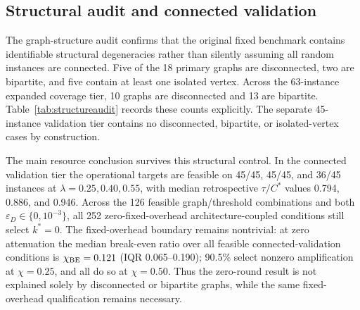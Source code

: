 \documentclass[5p,times]{elsarticle}
\begin{document}
\subsection{Structural audit and connected validation}
The graph-structure audit confirms that the original fixed benchmark contains identifiable structural degeneracies rather than silently assuming all random instances are connected. Five of the 18 primary graphs are disconnected, two are bipartite, and five contain at least one isolated vertex. Across the 63-instance expanded coverage tier, 10 graphs are disconnected and 13 are bipartite. Table~\ref{tab:structureaudit} records these counts explicitly. The separate 45-instance validation tier contains no disconnected, bipartite, or isolated-vertex cases by construction.

\begin{table}[t]
\centering
\caption{Structural audit of the exact graph tiers. The connected validation tier is conditioned on connected, non-bipartite topology; it does not replace the original primary benchmark.}
\label{tab:structureaudit}

\end{table}

The main resource conclusion survives this structural control. In the connected validation tier the operational targets are feasible on 45/45, 45/45, and 36/45 instances at $\lambda=0.25,0.40,0.55$, with median retrospective $\tau/C^*$ values 0.794, 0.886, and 0.946. Across the 126 feasible graph/threshold combinations and both $\varepsilon_D\in\{0,10^{-3}\}$, all 252 zero-fixed-overhead architecture-coupled conditions still select $k^*=0$. The fixed-overhead boundary remains nontrivial: at zero attenuation the median break-even ratio over all feasible connected-validation conditions is $\chi_{\rm BE}=0.121$ (IQR 0.065--0.190); 90.5\% select nonzero amplification at $\chi=0.25$, and all do so at $\chi=0.50$. Thus the zero-round result is not explained solely by disconnected or bipartite graphs, while the same fixed-overhead qualification remains necessary.

\begin{table}[t]
\centering
\caption{Connected, non-bipartite exact validation through $n=14$. The zero-overhead column reports the fraction selecting $k>0$ at $\varepsilon_D=0$; $\chi_{BE}$ is the exact fixed-overhead break-even ratio in oracle-cost units.}
\label{tab:connectedvalidation}

\end{table}
\end{document}
